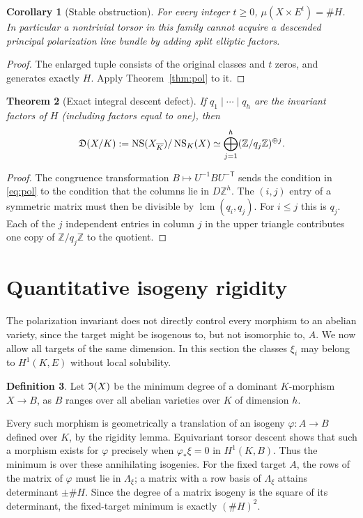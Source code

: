 \documentclass[11pt,a4paper]{article}
\newtheorem{theorem}{Theorem}[section]
\newtheorem{corollary}[theorem]{Corollary}
\theoremstyle{definition}\newtheorem{definition}[theorem]{Definition}
\theoremstyle{remark}\newtheorem{remark}[theorem]{Remark}
\newcommand{\ZZ}{\mathbb Z}\newcommand{\QQ}{\mathbb Q}\newcommand{\FF}{\mathbb F}
\numberwithin{equation}{section}
\begin{document}
\begin{corollary}[Stable obstruction]\label{cor:stable}
For every integer $t\geq0$, $\mu(X\times E^t)=\#H$. In particular a nontrivial torsor in this family cannot acquire a descended principal polarization line bundle by adding split elliptic factors.
\end{corollary}
\begin{proof}
The enlarged tuple consists of the original classes and $t$ zeros, and generates exactly $H$. Apply Theorem~\ref{thm:pol} to it.
\end{proof}

\begin{theorem}[Exact integral descent defect]\label{thm:def}
If $q_1\mid\cdots\mid q_h$ are the invariant factors of $H$ (including factors equal to one), then
\begin{equation}
\D(X/K):=\NS(X_{\overline K})/\NS_K(X)
\simeq\bigoplus_{j=1}^h(\ZZ/q_j\ZZ)^{\oplus j}.
\end{equation}
\end{theorem}
\begin{proof}
The congruence transformation $B\mapsto U^{-1}BU^{-\mathsf T}$ sends the condition in \eqref{eq:pol} to the condition that the columns lie in $D\ZZ^h$. The $(i,j)$ entry of a symmetric matrix must then be divisible by $\operatorname{lcm}(q_i,q_j)$. For $i\leq j$ this is $q_j$. Each of the $j$ independent entries in column $j$ in the upper triangle contributes one copy of $\ZZ/q_j\ZZ$ to the quotient.
\end{proof}

\section{Quantitative isogeny rigidity}
The polarization invariant does not directly control every morphism to an abelian variety, since the target might be isogenous to, but not isomorphic to, $A$. We now allow all targets of the same dimension. In this section the classes $\xi_i$ may belong to $H^1(K,E)$ without local solubility.
\begin{definition}
Let $\mathfrak I(X)$ be the minimum degree of a dominant $K$-morphism $X\to B$, as $B$ ranges over all abelian varieties over $K$ of dimension $h$.
\end{definition}
Every such morphism is geometrically a translation of an isogeny $\varphi:A\to B$ defined over $K$, by the rigidity lemma. Equivariant torsor descent shows that such a morphism exists for $\varphi$ precisely when $\varphi_*\xi=0$ in $H^1(K,B)$. Thus the minimum is over these annihilating isogenies. For the fixed target $A$, the rows of the matrix of $\varphi$ must lie in $\Lambda_\xi$; a matrix with a row basis of $\Lambda_\xi$ attains determinant $\pm\#H$. Since the degree of a matrix isogeny is the square of its determinant, the fixed-target minimum is exactly $(\#H)^2$.
\end{document}
